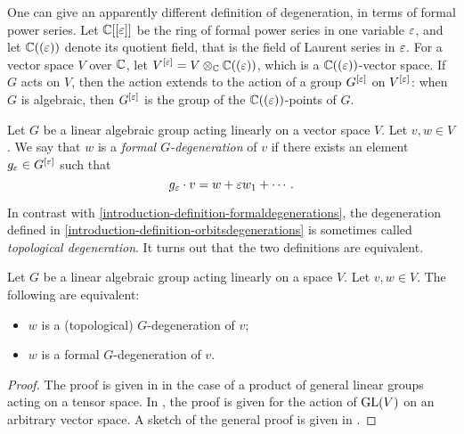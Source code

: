 One can give an apparently different definition of degeneration, in terms of formal power series. Let $\mathbb{C}[[\varepsilon]]$ be the ring of formal power series in one variable $\varepsilon$, and let $\mathbb{C}((\varepsilon))$ denote its quotient field, that is the field of Laurent series in $\varepsilon$. For a vector space $V$ over $\mathbb{C}$, let $V^{[\varepsilon]} = V \otimes_{\mathbb{C}} \mathbb{C}((\varepsilon))$, which is a $\mathbb{C}((\varepsilon))$-vector space. If $G$ acts on $V$, then the action extends to the action of a group $G^{[\varepsilon]}$ on $V^{[\varepsilon]}$: when $G$ is algebraic, then $G^{[\varepsilon]}$ is the group of the $\mathbb{C}((\varepsilon))$-points of $G$. 
\begin{definition}
\label{introduction-definition-formaldegenerations}
Let $G$ be a linear algebraic group acting linearly on a vector space $V$. Let $v,w \in V$. We say that $w$ is a \emph{formal $G$-degeneration} of $v$ if there exists an element $g_\varepsilon \in G^{[\varepsilon]}$ such that
\[
g_\varepsilon \cdot v = w + \varepsilon w_1 + \cdots .
\]
\end{definition}
In contrast with \ref{introduction-definition-formaldegenerations}, the degeneration defined in \ref{introduction-definition-orbitsdegenerations} is sometimes called \emph{topological degeneration}. It turns out that the two definitions are equivalent.
\begin{theorem}
\label{introduction-theorem-degenerationsequivalence}
Let $G$ be a linear algebraic group acting linearly on a space $V$. Let $v,w \in V$. The following are equivalent:
\begin{itemize}
 \item $w$ is a (topological) $G$-degeneration of $v$;
 \item $w$ is a formal $G$-degeneration of $v$.
\end{itemize}
\end{theorem}
\begin{proof}
The proof is given in \cite[Sec.20.6]{BCS97} in the case of a product of general linear groups acting on a tensor space. In \cite[Sec.2.3]{Kra84}, the proof is given for the action of $\mathrm{GL}(V)$ on an arbitrary vector space. A sketch of the general proof is given in \cite[Rmk.4.4]{CGZ23}.
\end{proof}


